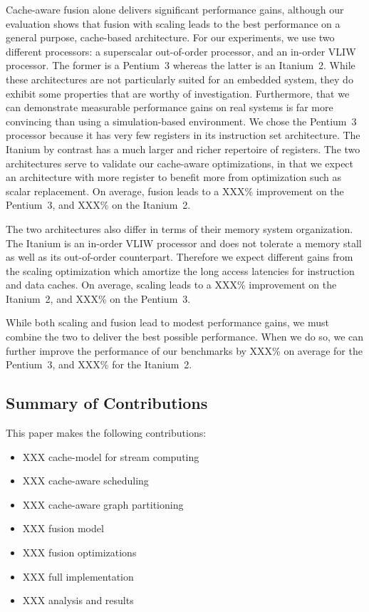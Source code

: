Cache-aware fusion alone delivers significant performance gains, although our
evaluation shows that fusion with scaling leads to the best
performance on a general purpose, cache-based architecture. For our
experiments, we use two different processors: a superscalar out-of-order
processor, and an in-order VLIW processor. The former is a Pentium~3
whereas the latter is an Itanium~2. While these architectures are not
particularly suited for an embedded system, they do exhibit some
properties that are worthy of investigation. Furthermore, that we can
demonstrate measurable performance gains on real systems is far more
convincing than using a simulation-based environment. We chose the
Pentium~3 processor because it has very few registers in its
instruction set architecture. The Itanium by contrast has a much 
larger and richer repertoire of registers. The two architectures serve
to validate our cache-aware optimizations, in that we expect an
architecture with more register to benefit more from optimization such
as scalar replacement. On average, fusion leads to a XXX\% improvement
on the Pentium~3, and XXX\% on the Itanium~2.

The two architectures also differ in terms of their memory system
organization. The Itanium is an in-order VLIW processor and does not
tolerate a memory stall as well as its out-of-order
counterpart. Therefore we expect different gains from the scaling
optimization which amortize the long access latencies for instruction
and data caches. On average, scaling leads to a XXX\% improvement on
the Itanium~2, and XXX\% on the Pentium~3.

While both scaling and fusion lead to modest performance gains, we
must combine the two to deliver the best possible performance. When we
do so, we can further improve the performance of our benchmarks by
XXX\% on average for the Pentium~3, and XXX\% for the Itanium~2.

\subsection{Summary of Contributions}

This paper makes the following contributions:
\begin{itemize}
\item XXX cache-model for stream computing
\item XXX cache-aware scheduling
\item XXX cache-aware graph partitioning
\item XXX fusion model
\item XXX fusion optimizations
\item XXX full implementation 
\item XXX analysis and results
\end{itemize}


